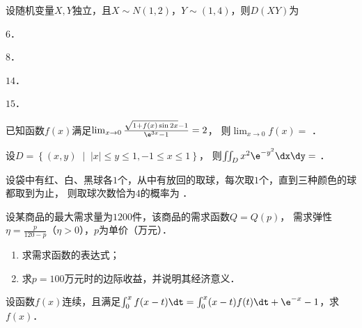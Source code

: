 \documentclass[plain,noanswer,medmath]{../../template/jnuexam}
\begin{document}
\begin{problem}
设随机变量$X,Y$独立，且$X\sim N(1,2)$，$Y\sim (1,4)$，则$D(XY)$为\pickout{}
\begin{abcd}
\item $6$．
\item $8$．
\item $14$．
\item $15$．
\end{abcd}
\end{problem}




\begin{problem}
已知函数$f(x)$满足$\lim_{x \to 0} \frac{\sqrt{1 + f(x)\sin 2x} - 1}{\e^{3x} - 1} = 2$，
则$\lim_{x \to 0} f(x) =$ \fillin{}．
\end{problem}






\begin{problem}
设$D = \left\{(x,y)\;\middle|\;|x| \le y \le 1, - 1 \le x \le 1 \right\}$，
则$\iint_D x^2\e^{- y^2} \dx\dy =$ \fillin{}．
\end{problem}




\begin{problem}
设袋中有红、白、黑球各$1$个，从中有放回的取球，每次取$1$个，直到三种颜色的球都取到为止，
则取球次数恰为$4$的概率为 \fillin{}．
\end{problem}






\begin{problem}[points=10]
设某商品的最大需求量为$1200$件，该商品的需求函数$Q = Q(p)$，
需求弹性$\eta = \frac{p}{120 - p}$（$\eta > 0$），$p$为单价（万元）．
\begin{enumerate}
\item 求需求函数的表达式；
\item 求$p = 100$万元时的边际收益，并说明其经济意义．
\end{enumerate}
\end{problem}




\begin{problem}[points=10]
设函数$f(x)$连续，且满足$\int_0^x f(x - t) \dt = \int_0^x (x - t)f(t)\dt + \e^{- x} - 1$，求$f(x)$．
\end{problem}
\end{document}
